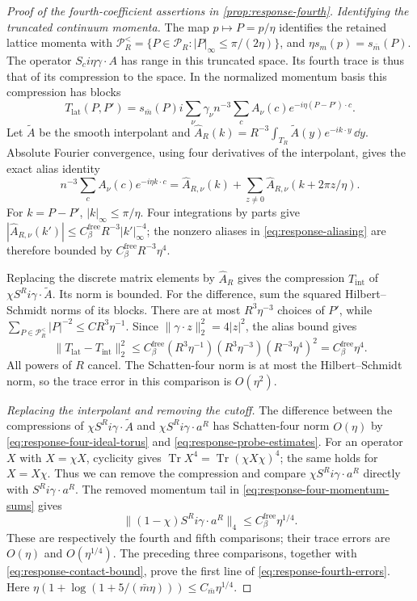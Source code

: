 \documentclass[11pt,letterpaper,reqno]{amsart}
\begin{document}
\begin{proof}[Proof of the fourth-coefficient assertions in \cref{prop:response-fourth}]
\emph{Identifying the truncated continuum momenta.}
The map $p\mapsto P=p/\eta$ identifies the retained
lattice momenta with
$\mathcal P_R^<=\{P\in\mathcal P_R:|P|_\infty\le\pi/(2\eta)\}$,
and $\eta s_m(p)=s_{\bar m}(P)$. The operator
$S_ci\eta\gamma\cdot A$ has range in this truncated
space. Its fourth trace is thus that of its compression
to the space. In the normalized momentum basis this
compression has blocks
\[
 T_{\mathrm{lat}}(P,P')=s_{\bar m}(P)i\sum_\nu\gamma_\nu
                 n^{-3}\sum_cA_\nu(c)e^{-i\eta(P-P')\cdot c}.
\]
Let $\widetilde A$ be the smooth interpolant and
$\widehat A_R(k)=R^{-3}\int_{T_R}\widetilde A(y)e^{-ik\cdot y}\,\dd y$.
Absolute Fourier convergence, using four derivatives
of the interpolant, gives the exact alias identity
\begin{equation}\label{eq:response-aliasing}
 n^{-3}\sum_cA_\nu(c)e^{-i\eta k\cdot c}
    =\widehat A_{R,\nu}(k)+
          \sum_{z\ne0}\widehat A_{R,\nu}(k+2\pi z/\eta).
\end{equation}
For $k=P-P'$, $|k|_\infty\le\pi/\eta$. Four integrations
by parts give
$|\widehat A_{R,\nu}(k')|\le C_\beta^{\mathrm{free}} R^{-3}|k'|_\infty^{-4}$;
the nonzero aliases in \eqref{eq:response-aliasing} are
therefore bounded by $C_\beta^{\mathrm{free}} R^{-3}\eta^4$.

Replacing the discrete matrix elements by $\widehat A_R$
gives the compression $T_{\mathrm{int}}$ of
$\chi S^Ri\gamma\cdot\widetilde A$. Its norm is bounded.
For the difference, sum the squared Hilbert--Schmidt
norms of its blocks. There are at most $R^3\eta^{-3}$
choices of $P'$, while
$\sum_{P\in\mathcal P_R^<}|P|^{-2}\le CR^3\eta^{-1}$.
Since $\|\gamma\cdot z\|_2^2=4|z|^2$, the alias bound
gives
\[
 \|T_{\mathrm{lat}}-T_{\mathrm{int}}\|_2^2
     \le C_\beta^{\mathrm{free}}(R^3\eta^{-1})(R^3\eta^{-3})
                                     (R^{-3}\eta^4)^2
     =C_\beta^{\mathrm{free}}\eta^4.
\]
All powers of $R$ cancel. The Schatten-four norm is
at most the Hilbert--Schmidt norm, so the trace error
in this comparison is $O(\eta^2)$.

\emph{Replacing the interpolant and removing the cutoff.}
The difference between the compressions of
$\chi S^Ri\gamma\cdot\widetilde A$ and
$\chi S^Ri\gamma\cdot a^R$ has Schatten-four norm
$O(\eta)$ by \eqref{eq:response-four-ideal-torus} and
\eqref{eq:response-probe-estimates}. For an operator
$X$ with $X=\chi X$, cyclicity gives
$\operatorname{Tr}X^4=\operatorname{Tr}(\chi X\chi)^4$;
the same holds for $X=X\chi$. Thus we can remove the
compression and compare $\chi S^Ri\gamma\cdot a^R$
directly with $S^Ri\gamma\cdot a^R$. The removed momentum
tail in \eqref{eq:response-four-momentum-sums} gives
\[
 \|(1-\chi)S^Ri\gamma\cdot a^R\|_4\le C_\beta^{\mathrm{free}}\eta^{1/4}.
\]
These are respectively the fourth and fifth comparisons;
their trace errors are $O(\eta)$ and $O(\eta^{1/4})$.
The preceding three comparisons, together with
\eqref{eq:response-contact-bound}, prove the first line
of \eqref{eq:response-fourth-errors}. Here
$\eta(1+\log(1+5/(\bar m\eta)))\le C_{\bar m}\eta^{1/4}$.


\end{proof}
\end{document}
